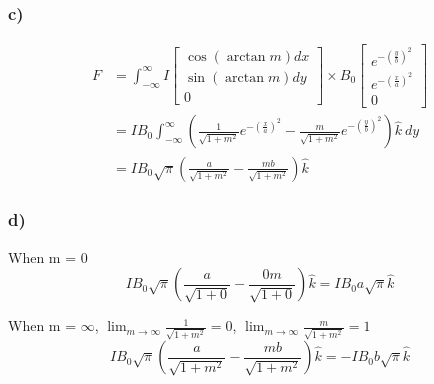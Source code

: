 \documentclass[../homework.tex]{subfiles}
\begin{document}
\subsubsection*{c)}
\begin{align*}
    F &= \int_{-\infty}^{\infty} I
      \begin{bmatrix}
          \cos{(\arctan{m})} dx \\
          \sin{(\arctan{m})} dy \\
          0
      \end{bmatrix} \times B_0
      \begin{bmatrix}
        e^{-\left(\frac{y}{b}\right)^2} \\
        e^{-\left(\frac{x}{a}\right)^2} \\
        0
    \end{bmatrix} \\
    &= I B_0 \int_{-\infty}^{\infty} \left(
        \frac{1}{\sqrt{1+m^2}} e^{-\left(\frac{x}{a}\right)^2} - \frac{m}{\sqrt{1+m^2}} e^{-\left(\frac{y}{b}\right)^2}
    \right)\hat{k}~dy  \\
    &= I B_0 \sqrt{\pi} \left(\frac{a}{\sqrt{1 + m^2}} - \frac{mb}{\sqrt{1 + m^2}} \right) \hat{k}
\end{align*}

\subsubsection*{d)}

\indent \indent When m = 0
\begin{equation*}
    I B_0 \sqrt{\pi} \left(\frac{a}{\sqrt{1 + 0}} - \frac{0 m}{\sqrt{1 + 0}} \right) \hat{k} = I B_0 a \sqrt{\pi} \hat{k}
\end{equation*}

When m = $\infty$, $\lim_{m \to \infty} \frac{1}{\sqrt{1+m^2}} = 0$, $\lim_{m \to \infty} \frac{m}{\sqrt{1+m^2}} = 1$
\begin{equation*}
    I B_0 \sqrt{\pi} \left(\frac{a}{\sqrt{1 + m^2}} - \frac{mb}{\sqrt{1 + m^2}} \right) \hat{k} = -I B_0 b \sqrt{\pi} \hat{k}
\end{equation*}
\end{document}
